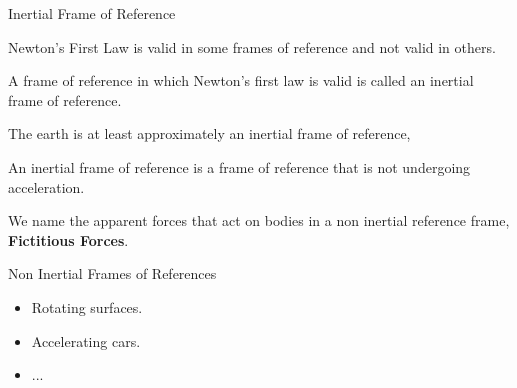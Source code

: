 \documentclass[]{beamer}
\begin{document}


 \begin{frame}
  Inertial Frame of Reference
    \vspace{5mm}
  

Newton's First Law is valid in some frames of reference and not valid in others. 
\vspace{3mm}
\pause

A frame of reference in which Newton’s first law is valid is called an inertial frame of
 reference.
 \vspace{3mm}
\pause

The earth is at least approximately an inertial frame of reference,

\vspace{3mm}
\pause

An inertial frame of reference is a frame of reference that is not undergoing acceleration.

\pause
We name the apparent forces that act on bodies in a non inertial reference frame, 
\textbf{Fictitious Forces}.



     \end{frame}





\begin{frame}
Non Inertial Frames of References

\vspace{5mm}
  
\begin{itemize}
\item Rotating surfaces.
\item Accelerating cars.
\item ...
\end{itemize}



     \end{frame}



\end{document}

